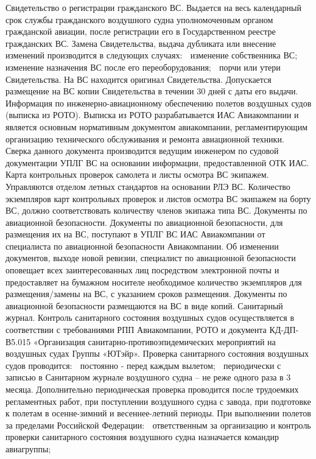 Свидетельство о регистрации гражданского ВС.
Выдается на весь календарный срок службы гражданского воздушного судна уполномоченным органом гражданской авиации, после регистрации его в Государственном реестре гражданских ВС.
Замена Свидетельства, выдача дубликата или внесение изменений производится в следующих случаях:
	изменение собственника ВС;
	изменение назначения ВС после его переоборудования;
	порчи или утери Свидетельства.
На ВС находится оригинал Свидетельства. Допускается размещение на ВС копии Свидетельства в течении 30 дней с даты его выдачи.
Информация по инженерно-авиационному обеспечению полетов воздушных судов (выписка из РОТО).
Выписка из РОТО разрабатывается ИАС Авиакомпании и является основным нормативным документом авиакомпании, регламентирующим организацию технического обслуживания и ремонта авиационной техники.     Сверка данного документа производится ведущим инженером по судовой документации УПЛГ ВС на основании информации, предоставленной ОТК ИАС. 
Карта контрольных проверок самолета и листы осмотра ВС экипажем.
Управляются отделом летных стандартов на основании РЛЭ ВС.
Количество экземпляров карт контрольных проверок и листов осмотра ВС экипажем на борту ВС, должно соответствовать количеству членов экипажа типа ВС.
Документы по авиационной безопасности.
Документы по авиационной безопасности, для размещения их на ВС, поступают в УПЛГ ВС ИАС Авиакомпании от специалиста по авиационной безопасности Авиакомпании. Об изменении документов, выходе новой ревизии, специалист по авиационной безопасности оповещает всех заинтересованных лиц посредством электронной почты и предоставляет на бумажном носителе необходимое количество экземпляров для размещения/замены на ВС, с указанием сроков размещения. Документы по авиационной безопасности размещаются на ВС в виде копий.
Санитарный журнал.
Контроль санитарного состояния воздушных судов осуществляется в соответствии с требованиями РПП Авиакомпании, РОТО и документа КД-ДП-В5.015 «Организация санитарно-противоэпидемических мероприятий на воздушных судах Группы «ЮТэйр».
 Проверка санитарного состояния воздушных судов проводится:
	постоянно - перед каждым вылетом;
	периодически с записью в Санитарном журнале воздушного судна – не реже одного раза в 3 месяца.       
Дополнительно периодическая проверка проводится после трудоемких регламентных работ, при поступлении воздушного судна с завода, при подготовке к полетам в осенне-зимний и весеннее-летний периоды.
При выполнении полетов за пределами Российской Федерации:
	ответственным за организацию и контроль проверки санитарного состояния воздушного судна назначается командир авиагруппы;
